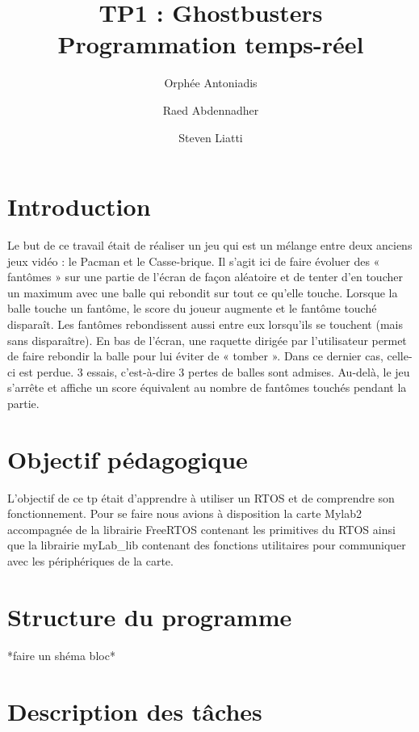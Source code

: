 \documentclass[a4paper]{article}
\title{TP1 : Ghostbusters\protect\\ Programmation temps-réel}
\author{Orphée Antoniadis \and Raed Abdennadher \and Steven Liatti}
\begin{document}
\maketitle
\newpage

\section{Introduction}
Le but de ce travail était de réaliser un jeu qui est un mélange entre deux
anciens jeux vidéo : le Pacman et le Casse-brique. Il s’agit ici de faire
évoluer des « fantômes » sur une partie de l’écran de façon aléatoire et de
tenter d’en toucher un maximum avec une balle qui rebondit sur tout ce qu’elle
touche. Lorsque la balle touche un fantôme, le score du joueur augmente et le
fantôme touché disparaît. Les fantômes rebondissent aussi entre eux lorsqu’ils
se touchent (mais sans disparaître). En bas de l’écran, une raquette dirigée par
l’utilisateur permet de faire rebondir la balle pour lui éviter de « tomber ».
Dans ce dernier cas, celle-ci est perdue. 3 essais, c’est-à-dire 3 pertes de
balles sont admises. Au-delà, le jeu s’arrête et affiche un score équivalent
au nombre de fantômes touchés pendant la partie.

\section{Objectif pédagogique}
L'objectif de ce tp était d'apprendre à utiliser un RTOS et de comprendre son
fonctionnement. Pour se faire nous avions à disposition la carte Mylab2 accompagnée
de la librairie FreeRTOS contenant les primitives du RTOS ainsi que la librairie
myLab\_lib contenant des fonctions utilitaires pour communiquer avec les périphériques
de la carte.

\section{Structure du programme}
*faire un shéma bloc*

\section{Description des tâches}
\end{document}
